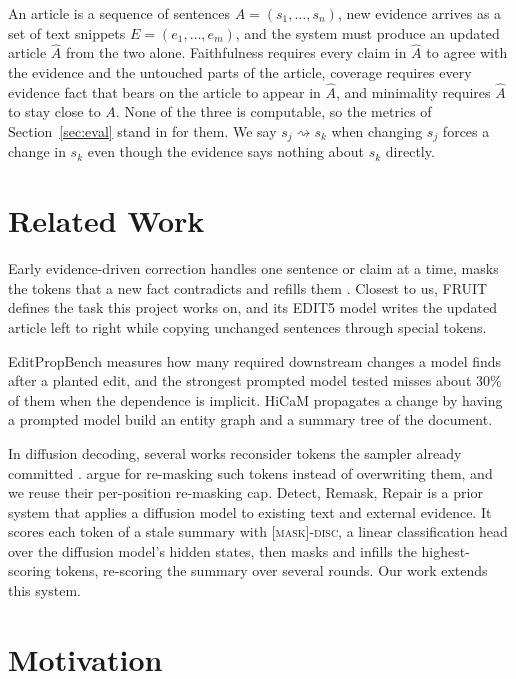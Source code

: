 \documentclass[11pt]{article}
\newcommand{\maskdisc}{\textsc{[mask]-disc}}
\begin{document}
An article is a sequence of sentences $A = (s_1, \dots, s_n)$, new evidence arrives as a set of text snippets $E = (e_1, \dots, e_m)$, and the system must produce an updated article $\hat{A}$ from the two alone. Faithfulness requires every claim in $\hat{A}$ to agree with the evidence and the untouched parts of the article, coverage requires every evidence fact that bears on the article to appear in $\hat{A}$, and minimality requires $\hat{A}$ to stay close to $A$. None of the three is computable, so the metrics of Section~\ref{sec:eval} stand in for them. We say $s_j \rightsquigarrow s_k$ when changing $s_j$ forces a change in $s_k$ even though the evidence says nothing about $s_k$ directly.

\section{Related Work}
\label{sec:related}

Early evidence-driven correction handles one sentence or claim at a time, masks the tokens that a new fact contradicts and refills them \citep{shah-etal-2020-automatic, thorne-vlachos-2021-evidence}. Closest to us, FRUIT \citep{iv-etal-2022-fruit} defines the task this project works on, and its EDIT5 model writes the updated article left to right while copying unchanged sentences through special tokens.

EditPropBench \citep{kruthof-2026-editpropbench} measures how many required downstream changes a model finds after a planted edit, and the strongest prompted model tested misses about 30\% of them when the dependence is implicit. HiCaM \citep{shi-etal-2025-hicam} propagates a change by having a prompted model build an entity graph and a summary tree of the document.

In diffusion decoding, several works reconsider tokens the sampler already committed \citep{wang-etal-2025-remasking, bie-etal-2026-llada21}. \citet{yao-2026-remask} argue for re-masking such tokens instead of overwriting them, and we reuse their per-position re-masking cap. Detect, Remask, Repair \citep[DRR;][]{zou-etal-2026-detect} is a prior system that applies a diffusion model to existing text and external evidence. It scores each token of a stale summary with \maskdisc{}, a linear classification head over the diffusion model's hidden states, then masks and infills the highest-scoring tokens, re-scoring the summary over several rounds. Our work extends this system.

\section{Motivation}
\label{sec:motivation}
\end{document}
